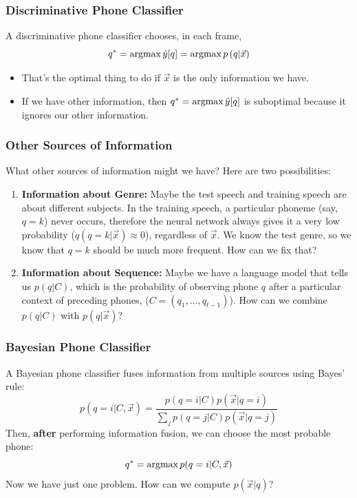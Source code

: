 \documentclass{beamer}
\newcommand{\argmax}{\operatornamewithlimits{argmax}}
\begin{document}
\begin{frame}
  \frametitle{Discriminative Phone Classifier}

  A discriminative phone classifier chooses, in each frame,
  \begin{displaymath}
    q^* = \argmax \hat{y}[q] = \argmax p\left(q|\vec{x}\right)
  \end{displaymath}
  \begin{itemize}
  \item
    That's the optimal thing to do if $\vec{x}$ is the only
    information we have.
  \item
    If we have other information, then $q^* = \argmax \hat{y}[q]$ is
    suboptimal because it ignores our other information.
  \end{itemize}
\end{frame}

\begin{frame}
  \frametitle{Other Sources of Information}

  What other sources of information might we have? Here are two
  possibilities:
  \begin{enumerate}
  \item {\bf Information about Genre:} Maybe the test speech and
    training speech are about different subjects.  In the training
    speech, a particular phoneme (say, $q=k$) never occurs, therefore
    the neural network always gives it a very low probability
    ($q(q=k|\vec{x})\approx 0$), regardless of $\vec{x}$.  We know the
    test genre, so we know that $q=k$ should be much more frequent.
    How can we fix that?
  \item {\bf Information about Sequence:} Maybe we have a language
    model that tells us $p(q|C)$, which is the
    probability of observing phone $q$ after a particular context
    of preceding phones, ($C=(q_1,\ldots,q_{t-1})$).  How can we combine
    $p(q|C)$ with $p\left(q|\vec{x}\right)$?
  \end{enumerate}
\end{frame}

\begin{frame}
  \frametitle{Bayesian Phone Classifier}

  A Bayesian phone classifier fuses information from multiple sources
  using Bayes' rule:
  \begin{displaymath}
    p(q=i|C,\vec{x}) = \frac{p(q=i|C)p(\vec{x}|q=i)}{\sum_j p(q=j|C)p(\vec{x}|q=j)}
  \end{displaymath}
  Then, {\bf after} performing information fusion, we can choose the
  most probable phone:
  \begin{displaymath}
    q^* = \argmax p(q=i|C,\vec{x})
  \end{displaymath}
  Now we have just one problem.  How can we compute $p(\vec{x}|q)$?
\end{frame}
\end{document}
